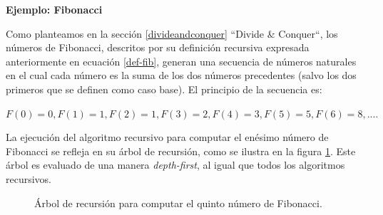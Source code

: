 \begin{flushleft}
    \textbf{Ejemplo: Fibonacci}
\end{flushleft}
Como planteamos en la sección \ref{divideandconquer} ``Divide \& Conquer``, los números de Fibonacci, descritos por su definición
recursiva expresada anteriormente en ecuación \ref{def-fib}, generan una secuencia de números naturales en el cual cada número es la suma
de los dos números precedentes (salvo los dos primeros que se definen como caso base). El principio de la secuencia es:
\begin{center}
    $F(0)=0, F(1)=1, F(2)=1, F(3)=2, F(4)=3, F(5)=5, F(6)=8, ....$
\end{center}

La ejecución del algoritmo recursivo para computar el enésimo número de Fibonacci se refleja en su árbol de recursión, como se ilustra en la
figura \ref{recursion_tree_fib}. Este árbol es evaluado de una manera \textit{depth-first}, al igual que todos los algoritmos recursivos.

\begin{figure}[!ht]
\begin{center}
\end{center}
\caption{Árbol de recursión para computar el quinto número de Fibonacci.}
\label{recursion_tree_fib}
\end{figure}

